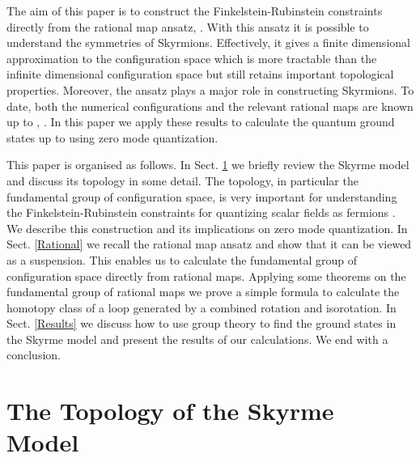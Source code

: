 \documentclass[a4paper,12pt]{article}
\begin{document}
The aim of this paper is to construct the Finkelstein-Rubinstein
constraints directly from the rational map ansatz,
\cite{Houghton:1998kg}. With this ansatz it is possible to understand
the symmetries of Skyrmions. Effectively, it gives a finite dimensional
approximation to the configuration space which is more tractable than
the infinite dimensional configuration space but still retains 
important topological properties.  Moreover, the ansatz plays a
major role in constructing Skyrmions.  To date, both the numerical
configurations and the relevant rational maps are known up to \coordHE{},
\cite{Battye:2000se, Battye:2001qn}. In this paper we apply these 
results to calculate the quantum ground states up to \coordHE{} using zero 
mode quantization. 
  
This paper is organised as follows. In Sect. \ref{SkyrmeModel} we briefly
review the Skyrme model and discuss its topology in some detail. The
topology, in particular the fundamental group of configuration space, is
very important for understanding the Finkelstein-Rubinstein constraints
for quantizing scalar fields as fermions \cite{Finkelstein:1968hy}. We
describe this construction and its implications on zero mode quantization.
In Sect. \ref{Rational} we recall the rational map ansatz 
\cite{Houghton:1998kg} and show that it can be viewed as a suspension.
This enables us to calculate the fundamental group of configuration space
directly from rational maps. Applying some theorems on the fundamental
group of rational maps we prove a simple formula to calculate the
homotopy class of a loop generated by a combined rotation and isorotation.
In Sect. \ref{Results} we discuss how to use group theory to find the 
ground states in the Skyrme model and present the results of our 
calculations. We end with a conclusion.  


\section{The Topology of the Skyrme Model}
\label{SkyrmeModel}
\end{document}
